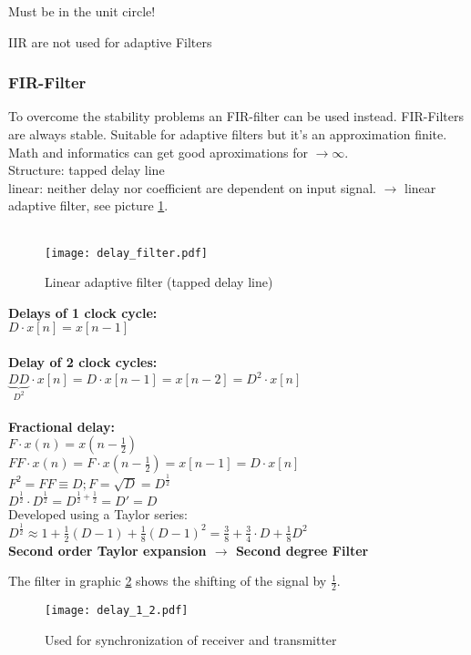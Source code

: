 Must be in the unit circle! 

IIR are not used for adaptive Filters


\subsubsection{FIR-Filter}

To overcome the stability problems an FIR-filter can be used instead. FIR-Filters are always stable.
Suitable for adaptive filters but it's an approximation \pfeil finite. Math and informatics can get good aproximations for $\rightarrow \infty$. \\
Structure: tapped delay line \\
linear: neither delay nor coefficient are dependent on input signal. $\rightarrow$ linear adaptive filter, see picture \ref{delayfilter}.\\ \\

\begin{figure}[H]
	\centering
	\texttt{[image: delay\_filter.pdf]}
	\caption{Linear adaptive filter (tapped delay line)}
	\label{delayfilter} 
\end{figure}

\textbf{Delays of 1 clock cycle:}\\
$D\cdot x[n] = x[n-1]$\\ \\
\textbf{Delay of 2 clock cycles:}\\
$\underbrace{DD}_{D^2}\cdot x[n] = D \cdot x[n-1] = x[n-2]= D^2\cdot x[n] $\\ \\

\textbf{Fractional delay:}\\
$F \cdot x(n) = x(n-\frac{1}{2})$\\
$FF \cdot x(n) = F \cdot x(n-\frac{1}{2}) = x[n-1] = D \cdot x[n]$\\
$F^2 = FF  	\equiv D ; F= \sqrt{D} = D^{\frac{1}{2}}$\\
$D^{\frac{1}{2}} \cdot D^{\frac{1}{2}} = D^{\frac{1}{2}+\frac{1}{2}} = D' =D$ \\
Developed using a Taylor series: $D^{\frac{1}{2}} \approx  1+\frac{1}{2}(D-1)+ \frac{1}{8}(D-1)^2 = \frac{3}{8}+\frac{3}{4}\cdot D + \frac{1}{8} D^2$\\

\textbf{Second order Taylor expansion $\rightarrow$ Second degree Filter}

The filter in graphic \ref{delayfilter1_2} shows the shifting of the signal by $\frac{1}{2}$.
\begin{figure}[H]
	\centering
	\texttt{[image: delay\_1\_2.pdf]}
	\caption{Used for synchronization of receiver and transmitter}
	\label{delayfilter1_2} 
\end{figure}


